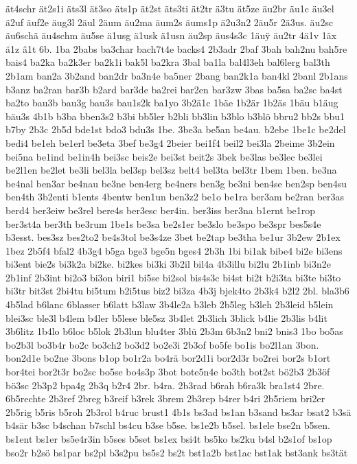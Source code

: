 {ät4schr
ät2s1i
äts3l
ät3so
äts1p
ät2st
äts3ti
ät2tr
ä3tu
ät5ze
äu2br
äu1c
äu3el
ä2uf
äuf2e
äug3l
2äul
2äum
äu2ma
äum2s
äums1p
ä2u3n2
2äu5r
2ä3us.
äu2sc
äu6schä
äu4schm
äu5se
ä1usg
ä1usk
ä1usn
äu2sp
äus4s3c
1äu^^ff
äu2tr
4ä1v
1äx
ä1z
â1t
6b.
1ba
2babs
ba3char
bach7t4e
backs4
2b3adr
2baf
3bah
bah2nu
bah5re
bais4
ba2ka
ba2k3er
ba2k1i
bak5l
ba2kra
3bal
ba1la
bal4l3eh
bal6lerg
bal3th
2b1am
ban2a
3b2and
ban2dr
ba3n4e
ba5ner
2bang
ban2k1a
ban4kl
2banl
2b1ans
b3anz
ba2ran
bar3b
b2ard
bar3de
ba2rei
bar2en
bar3zw
3bas
ba5sa
ba2sc
ba4st
ba2to
bau3b
bau3g
bau3s
bau1s2k
ba1yo
3b2ä1c
1bäe
1b2är
1b2äs
1bäu
b1äug
bäu3s
4b1b
b3ba
bben3s2
b3bi
bb5ler
b2bli
bb3lin
b3blo
b3blö
bbru2
bb2s
bbu1
b7by
2b3c
2b5d
bde1st
bdo3
bdu3s
1be.
3be3a
be5an
be4au.
b2ebe
1be1c
be2del
bedi4
be1eh
be1erl
be3eta
3bef
be3g4
2beier
bei1f4
beil2
bei3la
2beime
3b2ein
bei5na
be1ind
be1in4h
bei3sc
beis2e
bei3st
beit2s
3bek
be3las
be3lec
be3lei
be2l1en
be2let
be3li
bel3la
bel3sp
bel3sz
belt4
bel3ta
bel3tr
1bem
1ben.
be3na
be4nal
ben3ar
be4nau
be3ne
ben4erg
be4ners
ben3g
be3ni
ben4se
ben2sp
ben4su
ben4th
3b2enti
b1ents
4bentw
ben1un
ben3z2
be1o
be1ra
ber3am
be2ran
ber3as
berd4
ber3eiw
be3rel
bere4s
ber3esc
ber4in.
ber3iss
ber3na
b1ernt
be1rop
ber3st4a
ber3th
be3rum
1be1s
be3sa
be2s1er
be3slo
be3spo
be3spr
bes5s4e
b3esst.
bes3sz
bes2to2
be4s3tol
be3s4ze
3bet
be2tap
be3tha
be1ur
3b2ew
2b1ex
1bez
2b5f4
bfal2
4b3g4
b5ga
bge3
bge5n
bges4
2b3h
1bi
bi1ak
bibe4
bi2e
bi3ens
bi3ent
bie2s
bi3k2a
bi2ke.
bi2kes
bi3ki
3b2il
bil4a
4b3illu
bi2lu
2b1inb
bi3n2e
2b1inf
2b3int
bi2o3
bi3on
biri1
bi5se
bi2sol
bis4s3c
bi4st
bi2t
b2i3ta
bi3te
bi3to
bi3tr
bit3st
2bi4tu
bi5tum
b2i5tus
biz2
bi3za
4b3j
bjek4to
2b3k4
b2l2
2bl.
bla3b6
4b5lad
b6lanc
6blasser
b6latt
b3law
3b4le2a
b3leb
2b5leg
b3leh
2b3leid
b5lein
blei3sc
ble3l
b4lem
b4ler
b5lese
ble5sz
3b4let
2b3lich
3blick
b4lie
2b3lis
b4lit
3b6litz
1b4lo
b6loc
b5lok
2b3lun
blu4ter
3blü
2b3m
6b3n2
bni2
bnis3
1bo
bo5as
bo2b3l
bo3b4r
bo2c
bo3ch2
bo3d2
bo2e3i
2b3of
bo5fe
bo1is
bo2l1an
3bon.
bon2d1e
bo2ne
3bons
b1op
bo1r2a
bo4rä
bor2d1i
bor2d3r
bo2rei
bor2s
b1ort
bor4tei
bor2t3r
bo2sc
bo5se
bo4s3p
3bot
bote5n4e
bo3th
bot2st
bö2b3
2b3öf
bö3sc
2b3p2
bpa4g
2b3q
b2r4
2br.
b4ra.
2b3rad
b6rah
b6ra3k
bra1st4
2bre.
6b5rechte
2b3ref
2breg
b3reif
b3rek
3brem
2b3rep
b4rer
b4ri
2b5riem
bri2er
2b5rig
b5ris
b5roh
2b3rol
b4ruc
brust1
4b1s
bs3ad
bs1an
b3sand
bs3ar
bsat2
b3sä
b4sär
b3sc
b4schan
b7schl
bs4cu
b3se
b5se.
bs1e2b
b5sel.
bs1ele
bse2n
b5sen.
bs1ent
bs1er
bs5e4r3in
b5ses
b5set
bs1ex
bsi4t
bs5ko
bs2ku
b4sl
b2s1of
bs1op
bso2r
b2sö
bs1par
bs2pl
b3s2pu
bs5s2
bs2t
bst1a2b
bst1ac
bst1ak
bst3ank
bs3tät
}
